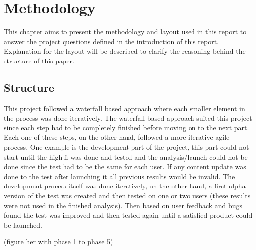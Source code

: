 
\chapter{Methodology} %

\label{Working_process} %

This chapter aims to present the methodology and layout used in this report to answer the project questions defined in the introduction of this report. Explanation for the layout will be described to clarify the reasoning behind the structure of this paper.


\section{Structure}
This project followed a waterfall based approach where each smaller element in the process was done iteratively. The waterfall based approach suited this project since each step had to be completely finished before moving on to the next part. Each one of these steps, on the other hand, followed a more iterative agile process. One example is the development part of the project, this part could not start until the high-fi was done and tested and the analysis/launch could not be done since the test had to be the same for each user. If any content update was done to the test after launching it all previous results would be invalid. The development process itself was done iteratively, on the other hand, a first alpha version of the test was created and then tested on one or two users (these results were not used in the finished analysis). Then based on user feedback and bugs found the test was improved and then tested again until a satisfied product could be launched.

(figure her with phase 1 to phase 5)

